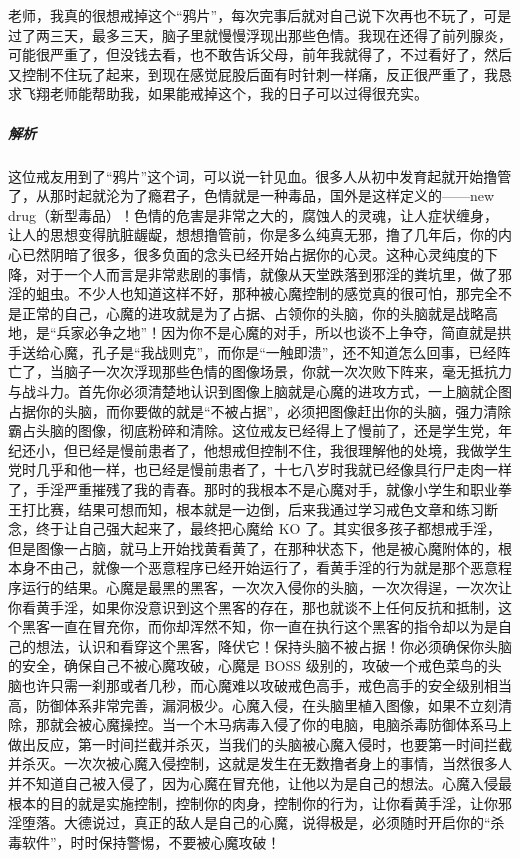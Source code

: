 \begin{case}
    老师，我真的很想戒掉这个“鸦片”，每次完事后就对自己说下次再也不玩了，可是过了两三天，最多三天，脑子里就慢慢浮现出那些色情。我现在还得了前列腺炎，可能很严重了，但没钱去看，也不敢告诉父母，前年我就得了，不过看好了，然后又控制不住玩了起来，到现在感觉屁股后面有时针刺一样痛，反正很严重了，我恳求飞翔老师能帮助我，如果能戒掉这个，我的日子可以过得很充实。
    \subparagraph{解析} 这位戒友用到了“鸦片”这个词，可以说一针见血。很多人从初中发育起就开始撸管了，从那时起就沦为了瘾君子，色情就是一种毒品，国外是这样定义的——new drug（新型毒品）！色情的危害是非常之大的，腐蚀人的灵魂，让人症状缠身，让人的思想变得肮脏龌龊，想想撸管前，你是多么纯真无邪，撸了几年后，你的内心已然阴暗了很多，很多负面的念头已经开始占据你的心灵。这种心灵纯度的下降，对于一个人而言是非常悲剧的事情，就像从天堂跌落到邪淫的粪坑里，做了邪淫的蛆虫。不少人也知道这样不好，那种被心魔控制的感觉真的很可怕，那完全不是正常的自己，心魔的进攻就是为了占据、占领你的头脑，你的头脑就是战略高地，是“兵家必争之地”！因为你不是心魔的对手，所以也谈不上争夺，简直就是拱手送给心魔，孔子是“我战则克”，而你是“一触即溃”，还不知道怎么回事，已经阵亡了，当脑子一次次浮现那些色情的图像场景，你就一次次败下阵来，毫无抵抗力与战斗力。首先你必须清楚地认识到图像上脑就是心魔的进攻方式，一上脑就企图占据你的头脑，而你要做的就是“不被占据”，必须把图像赶出你的头脑，强力清除霸占头脑的图像，彻底粉碎和清除。这位戒友已经得上了慢前了，还是学生党，年纪还小，但已经是慢前患者了，他想戒但控制不住，我很理解他的处境，我做学生党时几乎和他一样，也已经是慢前患者了，十七八岁时我就已经像具行尸走肉一样了，手淫严重摧残了我的青春。那时的我根本不是心魔对手，就像小学生和职业拳王打比赛，结果可想而知，根本就是一边倒，后来我通过学习戒色文章和练习断念，终于让自己强大起来了，最终把心魔给 KO 了。其实很多孩子都想戒手淫，但是图像一占脑，就马上开始找黄看黄了，在那种状态下，他是被心魔附体的，根本身不由己，就像一个恶意程序已经开始运行了，看黄手淫的行为就是那个恶意程序运行的结果。心魔是最黑的黑客，一次次入侵你的头脑，一次次得逞，一次次让你看黄手淫，如果你没意识到这个黑客的存在，那也就谈不上任何反抗和抵制，这个黑客一直在冒充你，而你却浑然不知，你一直在执行这个黑客的指令却以为是自己的想法，认识和看穿这个黑客，降伏它！保持头脑不被占据！你必须确保你头脑的安全，确保自己不被心魔攻破，心魔是 BOSS 级别的，攻破一个戒色菜鸟的头脑也许只需一刹那或者几秒，而心魔难以攻破戒色高手，戒色高手的安全级别相当高，防御体系非常完善，漏洞极少。心魔入侵，在头脑里植入图像，如果不立刻清除，那就会被心魔操控。当一个木马病毒入侵了你的电脑，电脑杀毒防御体系马上做出反应，第一时间拦截并杀灭，当我们的头脑被心魔入侵时，也要第一时间拦截并杀灭。一次次被心魔入侵控制，这就是发生在无数撸者身上的事情，当然很多人并不知道自己被入侵了，因为心魔在冒充他，让他以为是自己的想法。心魔入侵最根本的目的就是实施控制，控制你的肉身，控制你的行为，让你看黄手淫，让你邪淫堕落。大德说过，真正的敌人是自己的心魔，说得极是，必须随时开启你的“杀毒软件”，时时保持警惕，不要被心魔攻破！
\end{case}

